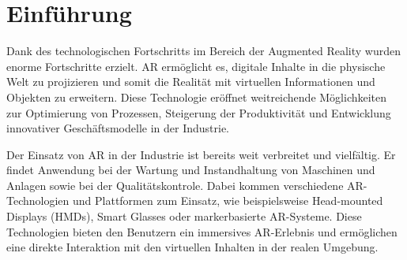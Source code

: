\section{Einführung}

Dank des technologischen Fortschritts im Bereich der Augmented Reality wurden
enorme Fortschritte erzielt. AR ermöglicht es, digitale Inhalte in die
physische Welt zu projizieren und somit die Realität mit virtuellen
Informationen und Objekten zu erweitern. Diese Technologie eröffnet
weitreichende Möglichkeiten zur Optimierung von Prozessen, Steigerung der
Produktivität und Entwicklung innovativer Geschäftsmodelle in der Industrie.

Der Einsatz von AR in der Industrie ist bereits weit verbreitet und vielfältig.
Er findet Anwendung bei der Wartung und Instandhaltung von Maschinen und
Anlagen sowie bei der Qualitätskontrole. Dabei kommen verschiedene
AR-Technologien und Plattformen zum Einsatz, wie beispielsweise Head-mounted
Displays (HMDs), Smart Glasses oder markerbasierte AR-Systeme. Diese
Technologien bieten den Benutzern ein immersives AR-Erlebnis und ermöglichen
eine direkte Interaktion mit den virtuellen Inhalten in der realen Umgebung.